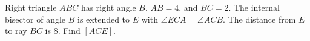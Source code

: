 Right triangle $ABC$ has right angle $B$, $AB=4$, and $BC=2$. The internal bisector of angle $B$ is extended to $E$ with $\angle ECA=\angle ACB$. The distance from $E$ to ray $BC$ is $8$. Find $[ACE]$.
